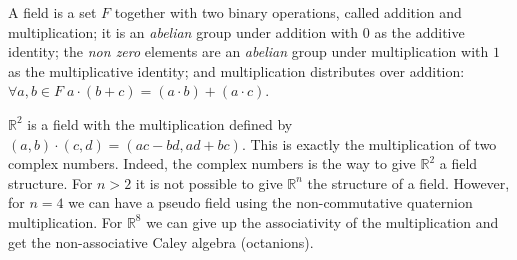 \documentclass[11pt,fleqn]{book} %
\def\R{\mathbb{R}}
\begin{document}
\begin{definition}[Field]
    A field is a set $F$ together with two binary operations, called addition and multiplication; 
    it is an \textit{abelian} group under addition with $0$ as the additive identity; 
    the \textit{non zero} elements are an \textit{abelian} group under multiplication with $1$ as the multiplicative identity; 
    and multiplication distributes over addition: $\forall a,b\in F\; a\cdot(b+c)=(a\cdot b) + (a\cdot c)$.
\end{definition}

\begin{remark}
    $\R^2$ is a field with the multiplication defined by $(a,b)\cdot(c,d)=(ac-bd, ad+bc)$. This is exactly the multiplication of two
    complex numbers. Indeed, the complex numbers is the way to give $\R^2$ a field structure. For $n>2$ it is not possible to give $\R^n$
    the structure of a field. However, for $n=4$ we can have a pseudo field using the non-commutative quaternion multiplication.
    For $\R^8$ we can give up the associativity of the multiplication and get the non-associative Caley algebra (octanions).
\end{remark}
\end{document}
